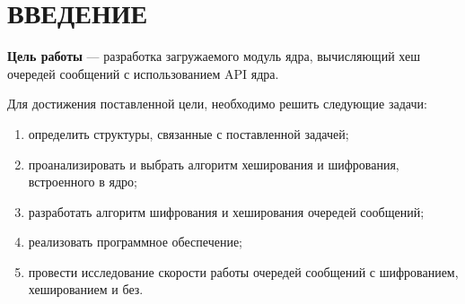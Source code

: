 \section*{\large ВВЕДЕНИЕ}



\textbf{Цель работы} --- разработка загружаемого модуль ядра, вычисляющий хеш очередей сообщений с использованием API ядра.


Для достижения поставленной цели, необходимо решить следующие задачи:
\begin{enumerate}
    \item определить структуры, связанные с поставленной задачей;
    \item проанализировать и выбрать алгоритм хеширования и шифрования, встроенного в ядро;
    \item разработать алгоритм шифрования и хеширования очередей сообщений;
    \item реализовать программное обеспечение;
    \item провести исследование скорости работы очередей сообщений с шифрованием, хешированием и без.
\end{enumerate}